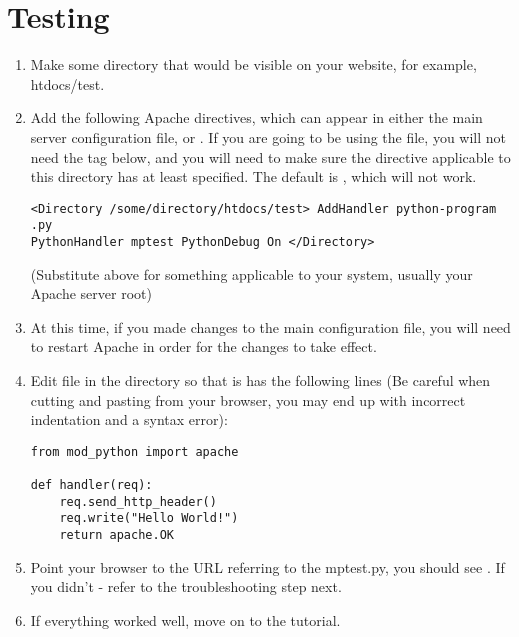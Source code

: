 \section{Testing\label{inst-testing}}

\begin{enumerate}

\item
Make some directory that would be visible on your website, for
example, htdocs/test.

\item
Add the following Apache directives, which can appear in either the
main server configuration file, or .  If you are going
to be using the  file, you will not need the
 tag below, and you will need to make sure the
 directive applicable to this directory has at least
 specified. The default is , which will not work.

\begin{verbatim}
<Directory /some/directory/htdocs/test> AddHandler python-program .py
PythonHandler mptest PythonDebug On </Directory>
\end{verbatim}

(Substitute  above for something applicable to
your system, usually your Apache server root)

\item
At this time, if you made changes to the main configuration file, you
will need to restart Apache in order for the changes to take effect.

\item
Edit  file in the  directory so that
is has the following lines (Be careful when cutting and pasting from
your browser, you may end up with incorrect indentation and a syntax
error):

\begin{verbatim}
from mod_python import apache

def handler(req):
    req.send_http_header()
    req.write("Hello World!")
    return apache.OK 
\end{verbatim}

\item
Point your browser to the URL referring to the mptest.py, you should
see . If you didn't - refer to the
troubleshooting step next.

\item
If everything worked well, move on to the tutorial. 

\end{enumerate}


